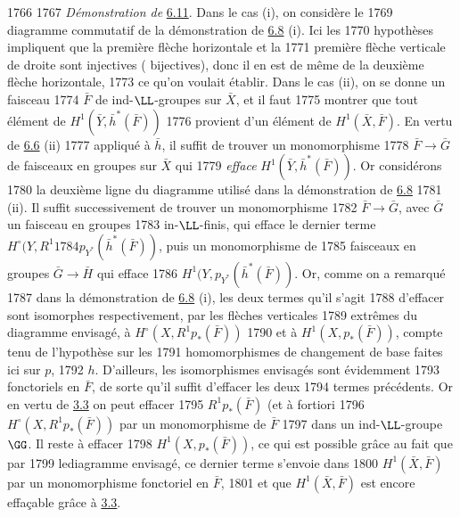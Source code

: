   1766	
  1767		\emph{Démonstration de} \hyperref[XII.prop6.11]{6.11}. Dans le cas (i), on considère le
  1769	diagramme commutatif de la démonstration de \hyperref[XII.prop6.8]{6.8} (i). Ici les
  1770	hypothèses impliquent que la première flèche horizontale et la
  1771	première flèche verticale de droite sont injectives (	bijectives), donc il en est de même de la deuxième flèche horizontale,
  1773	ce qu'on voulait établir. Dans le cas (ii), on se donne un faisceau
  1774	$\bar{F}$ de ind-$\LL$-groupes sur $\bar{X}$, et il faut
  1775	montrer que tout élément de $H^1(\bar{Y},\bar{h}^{\ast}(\bar{F}))$
  1776	provient d'un élément de $H^1(\bar{X},\bar{F})$. En vertu de \hyperref[XII.cor6.6]{6.6} (ii)
  1777	appliqué à $\bar{h}$, il suffit de trouver un monomorphisme
  1778	$\bar{F}\rightarrow \bar{G}$ de faisceaux en groupes sur $\bar{X}$ qui
  1779	\emph{efface} $H^1(\bar{Y},\bar{h}^{\ast}(\bar{F}))$. Or considérons
  1780	la deuxième ligne du diagramme utilisé dans la démonstration de \hyperref[XII.prop6.8]{6.8}
  1781	(ii). Il suffit successivement de trouver un monomorphisme
  1782	$\bar{F}\rightarrow \bar{G}$, avec $\bar{G}$ un faisceau en groupes
  1783	in-$\LL$-finis, qui efface le dernier terme $H^{\circ}(Y,R^1
  1784	p_{Y^{\ast}}(\bar{h}^{\ast}(\bar{F}))$, puis un monomorphisme de
  1785	faisceaux en groupes $\bar{G}\rightarrow \bar{H}$ qui efface
  1786	$H^1(Y,p_{Y^{\ast}}(\bar{h}^{\ast}(\bar{F}))$. Or, comme on a remarqué
  1787	dans la démonstration de \hyperref[XII.prop6.8]{6.8} (i), les deux termes qu'il s'agit
  1788	d'effacer sont isomorphes respectivement, par les flèches verticales
  1789	extrêmes du diagramme envisagé, à $H^{\circ}(X,R^1p_{\ast}(\bar{F}))$
  1790	et à $H^1(X,p_{\ast}(\bar{F}))$, compte tenu de l'hypothèse sur les
  1791	homomorphismes de changement de base faites ici sur $p$,
  1792	$h$. D'ailleurs, les isomorphismes envisagés sont évidemment
  1793	fonctoriels en $\bar{F}$, de sorte qu'il suffit d'effacer les deux
  1794	termes précédents. Or en vertu de \hyperref[XII.prop3.3]{3.3} on peut effacer
  1795	$R^1p_{\ast}(\bar{F})$ (et à fortiori
  1796	$H^{\circ}(X,R^1p_{\ast}(\bar{F}))$ par un monomorphisme de $\bar{F}$
  1797	dans un ind-$\LL$-groupe $\GG$. Il reste à effacer
  1798	$H^1(X,p_{\ast}(\bar{F}))$, ce qui est possible grâce au fait que par
  1799	le\pageoriginale diagramme envisagé, ce dernier terme s'envoie dans
  1800	$H^1(\bar{X},\bar{F})$ par un monomorphisme fonctoriel en $\bar{F}$,
  1801	et que $H^1(\bar{X},\bar{F})$ est encore effaçable grâce à \hyperref[XII.prop3.3]{3.3}.
